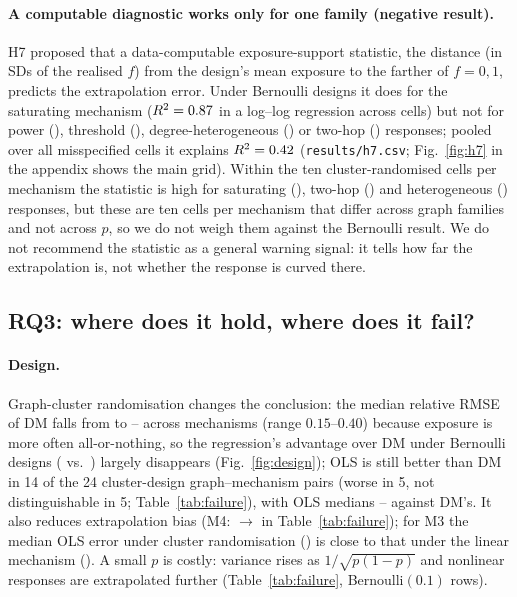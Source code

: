 \paragraph{A computable diagnostic works only for one family (negative result).}
H7 proposed that a data-computable exposure-support statistic, the distance (in SDs of the realised $f$) from the design's mean exposure to the farther of $f=0,1$, predicts the extrapolation error. Under Bernoulli designs it does for the saturating mechanism ($R^2=0.87$ in a log--log regression across cells) but not for power (\HsevenPow), threshold (\HsevenThresh), degree-heterogeneous (\HsevenHet) or two-hop (\HsevenBernTwohop) responses; pooled over all misspecified cells it explains $R^2=0.42$ (\texttt{results/h7.csv}; Fig.~\ref{fig:h7} in the appendix shows the main grid). Within the ten cluster-randomised cells per mechanism the statistic is high for saturating (\HsevenClSat), two-hop (\HsevenClTwohop) and heterogeneous (\HsevenClHet) responses, but these are ten cells per mechanism that differ across graph families and not across $p$, so we do not weigh them against the Bernoulli result. We do not recommend the statistic as a general warning signal: it tells how far the extrapolation is, not whether the response is curved there.

\subsection{RQ3: where does it hold, where does it fail?}
\paragraph{Design.} Graph-cluster randomisation changes the conclusion: the median relative RMSE of DM falls from \MainDM{} to \MainDMClOne--\MainDMClFour{} across mechanisms (range $0.15$--$0.40$) because exposure is more often all-or-nothing, so the regression's advantage over DM under Bernoulli designs (\MainOneOls{} vs.\ \MainDM) largely disappears (Fig.~\ref{fig:design}); OLS is still better than DM in 14 of the 24 cluster-design graph--mechanism pairs (worse in 5, not distinguishable in 5; Table~\ref{tab:failure}), with OLS medians \MainOlsClThree--\MainOlsClFour{} against DM's. It also reduces extrapolation bias (M4: \MainFourBias{} $\to$ \MainFourBiasCl{} in Table~\ref{tab:failure}); for M3 the median OLS error under cluster randomisation (\MainOlsClThree) is close to that under the linear mechanism (\MainOlsClOne). A small $p$ is costly: variance rises as $1/\sqrt{p(1-p)}$ and nonlinear responses are extrapolated further (Table~\ref{tab:failure}, Bernoulli$(0.1)$ rows).

